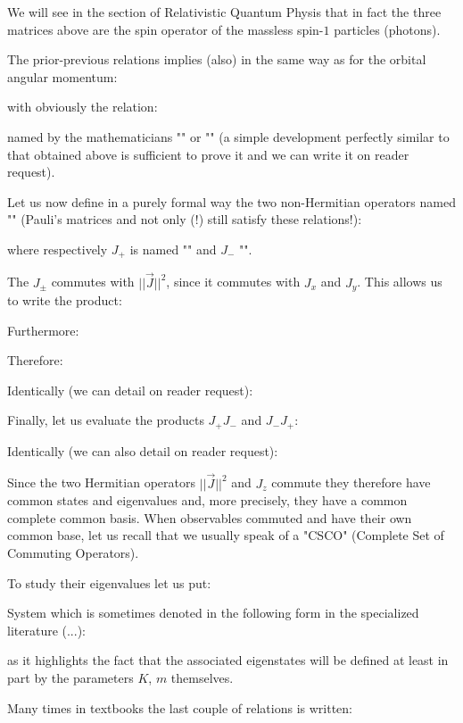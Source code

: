 	\begin{tcolorbox}[title=Remark,colframe=black,arc=10pt]
	We will see in the section of Relativistic Quantum Physis that in fact the three matrices above are the spin operator of the massless spin-$1$ particles (photons).
	\end{tcolorbox}
	The prior-previous relations implies (also) in the same way as for the orbital angular momentum:
	
	with obviously the relation:
	
	named by the mathematicians "" or "" (a simple development perfectly similar to that obtained above is sufficient to prove it and we can write it on reader request).
	
	Let us now define in a purely formal way the two non-Hermitian operators named "" (Pauli's matrices and not only (!) still satisfy these relations!):
	
	where respectively $J_+$ is named "" and $J_-$ "".

	The $J_{\pm}$ commutes with $||\vec{J}||^2$, since it commutes with $J_x$ and $J_y$. This allows us to write the product:
	
	Furthermore:
	
	Therefore:
	
	Identically (we can detail on reader request):
	
	Finally, let us evaluate the products $J_+J_-$ and $J_-J_+$:
	
	Identically (we can also detail on reader request):
	
	Since the two Hermitian operators $||\vec{J}||^2$ and $J_z$ commute they therefore have common states and eigenvalues and, more precisely, they have a common complete common basis. When observables commuted and have their own common base, let us recall that we usually speak of a "CSCO" (Complete Set of Commuting Operators).
	
	To study their eigenvalues let us put:
	
	System which is sometimes denoted in the following form in the specialized literature (...):
	
	as it highlights the fact that the associated eigenstates will be defined at least in part by the parameters $K$, $m$ themselves.
	
	Many times in textbooks the last couple of relations is written:
	
